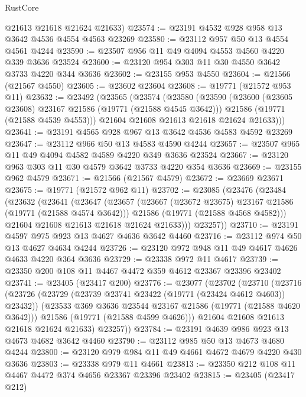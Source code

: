 \begin{lexlean}{RustCore}
\begin{coremodule}
      @21613
      @21618
      @21624
      @21633)
@23574 := @23191 @4532 @928 @958 @13 @3642 @4536 @4554 @4563 @23269
@23580 := @23112 @957 @50 @13 @4554 @4561 @4244
@23590 := @23507 @956 @11 @49 @4094 @4553 @4560 @4220 @339 @3636 @23524
@23600 := @23120 @954 @303 @11 @30 @4550 @3642 @3733 @4220 @344 @3636
@23602 := @23155 @953 @4550
@23604 := @21566 (@21567 @4550)
@23605 := @23602 @23604
@23608 := @19771 (@21572 @953 @11)
@23632 := @23492
    (@23565
      (@23574
        (@23580
          (@23590
            (@23600 (@23605 @23608) @23167 @21586 (@19771 (@21588 @4545 @3642)))
            @21586
            (@19771 (@21588 @4539 @4553)))
          @21604
          @21608
          @21613
          @21618
          @21624
          @21633)))
@23641 := @23191 @4565 @928 @967 @13 @3642 @4536 @4583 @4592 @23269
@23647 := @23112 @966 @50 @13 @4583 @4590 @4244
@23657 := @23507 @965 @11 @49 @4094 @4582 @4589 @4220 @349 @3636 @23524
@23667 := @23120 @963 @303 @11 @30 @4579 @3642 @3733 @4220 @354 @3636
@23669 := @23155 @962 @4579
@23671 := @21566 (@21567 @4579)
@23672 := @23669 @23671
@23675 := @19771 (@21572 @962 @11)
@23702 := @23085
    (@23476
      (@23484
        (@23632
          (@23641
            (@23647
              (@23657
                (@23667 (@23672 @23675) @23167 @21586 (@19771 (@21588 @4574 @3642)))
                @21586
                (@19771 (@21588 @4568 @4582)))
              @21604
              @21608
              @21613
              @21618
              @21624
              @21633)))
        @23257))
@23710 := @23191 @4597 @975 @923 @13 @4627 @4636 @3642 @4460
@23716 := @23112 @974 @50 @13 @4627 @4634 @4244
@23726 := @23120 @972 @948 @11 @49 @4617 @4626 @4633 @4220 @364 @3636
@23729 := @23338 @972 @11 @4617
@23739 := @23350 @200 @108 @11 @4467 @4472 @359 @4612 @23367 @23396 @23402
@23741 := @23405 (@23417 @200)
@23776 := @23077
    (@23702
      (@23710
        (@23716
          (@23726
            (@23729 (@23739 @23741 @23422 (@19771 (@23424 @4612 @4603)) @23432))
            (@23533 @369 @3636 @23544 @23167 @21586 (@19771 (@21588 @4620 @3642)))
            @21586
            (@19771 (@21588 @4599 @4626)))
          @21604
          @21608
          @21613
          @21618
          @21624
          @21633)
        @23257))
@23784 := @23191 @4639 @986 @923 @13 @4673 @4682 @3642 @4460
@23790 := @23112 @985 @50 @13 @4673 @4680 @4244
@23800 := @23120 @979 @984 @11 @49 @4661 @4672 @4679 @4220 @430 @3636
@23803 := @23338 @979 @11 @4661
@23813 := @23350 @212 @108 @11 @4467 @4472 @374 @4656 @23367 @23396 @23402
@23815 := @23405 (@23417 @212)

\end{coremodule}
\end{lexlean}
